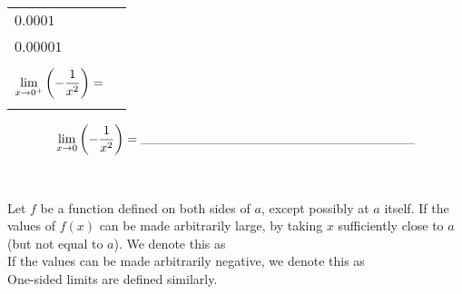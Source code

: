 \documentclass[notes]{subfiles}
\begin{document}
\begin{ex}
\begin{center}
\begin{minipage}{.45\textwidth}
\begin{tabu}{|X[c]|X[1.5,c]|}
												& \\ \hline
												& \\ 
						\(0.0001\)	& \\ 
												& \\ \hline
												& \\
						\(0.00001\)	&\\
												&\\ \hline\hline
												&\\
						\(\displaystyle \lim_{x\to 0^+}\left( -\dfrac{1}{x^2}\right) =\) & \\
												&\\ \hline
					\end{tabu}
				\end{minipage}
				\[\lim_{x\to 0}\lrpar{-\dfrac{1}{x^2}}= \blank{3}\]
			\end{center}	
		\end{ex}		
			\newpage
			
		\begin{rmk}[Notation]
			\\[25pt]
		\end{rmk}
			
		\begin{defn}
			Let \(f\) be a function defined on both sides of \(a\), except possibly at \(a\) itself.  If the values of \(f(x)\) can be made arbitrarily large, by taking \(x\) sufficiently close to \(a\) (but not equal to \(a\)).  We denote this as\newline\\[100pt]
			
			If the values can be made arbitrarily negative, we denote this as\\[75pt]
			One-sided limits are defined similarly.
		\end{defn}
			\newpage
			
\end{document}

